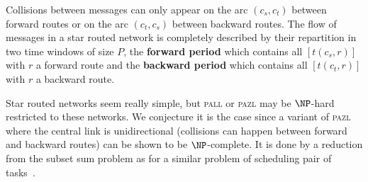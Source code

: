 \documentclass[10pt, conference, letterpaper]{IEEEtran}
\newcommand\pazl{\textsc{pazl}\xspace}
\newcommand\pall{\textsc{pall}\xspace}
\begin{document}
      
  Collisions between messages can only appear on the arc $(c_s,c_t)$ between forward routes or on the arc $(c_t,c_s)$
  between backward routes. The flow of messages in a star routed network is completely described by their repartition in two time windows of size $P$, the {\bf forward period} which contains all $[t(c_s,r)]$ with $r$ a forward route and the {\bf backward period} which contains all $[t(c_t,r)]$ with $r$ a backward route.

  Star routed networks seem really simple, but \pall or \pazl may be $\NP$-hard restricted to these networks.
  We conjecture it is the case since  a variant of \pazl where the central link is unidirectional (collisions can happen between forward and backward routes) can be shown to be $\NP$-complete. It is done by a reduction from the subset sum problem as for a similar problem of scheduling pair of tasks~\cite{orman1997complexity}. 
      
\end{document}
